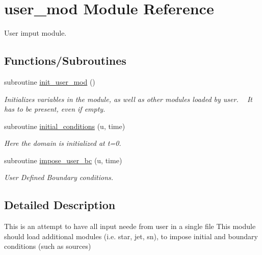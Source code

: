 \hypertarget{namespaceuser__mod}{}\section{user\+\_\+mod Module Reference}
\label{namespaceuser__mod}


User imput module.  


\subsection*{Functions/\+Subroutines}
\begin{DoxyCompactItemize}
\item 
\hypertarget{namespaceuser__mod_a302a8099e4696e80b634ec347d6a3bec}{}subroutine \hyperlink{namespaceuser__mod_a302a8099e4696e80b634ec347d6a3bec}{init\+\_\+user\+\_\+mod} ()\label{namespaceuser__mod_a302a8099e4696e80b634ec347d6a3bec}

\begin{DoxyCompactList}\small\item\em Initializes variables in the module, as well as other modules loaded by user. ~\newline
 It has to be present, even if empty. \end{DoxyCompactList}\item 
subroutine \hyperlink{namespaceuser__mod_af84e741a381f9d0caa55ccacc24d5244}{initial\+\_\+conditions} (u, time)
\begin{DoxyCompactList}\small\item\em Here the domain is initialized at t=0. \end{DoxyCompactList}\item 
subroutine \hyperlink{namespaceuser__mod_a6028f43a668931350eba8020d0466e4f}{impose\+\_\+user\+\_\+bc} (u, time)
\begin{DoxyCompactList}\small\item\em User Defined Boundary conditions. \end{DoxyCompactList}\end{DoxyCompactItemize}


\subsection{Detailed Description}
This is an attempt to have all input neede from user in a single file This module should load additional modules (i.\+e. star, jet, sn), to impose initial and boundary conditions (such as sources) 

